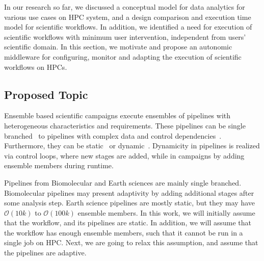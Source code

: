 
In our research so far, we discussed a conceptual model for data analytics for 
various use cases on HPC system, and a design comparison and execution time 
model for scientific workflows. In addition, we identified a need for execution 
of  scientific workflows with minimum user intervention, independent from 
users' scientific domain. In this section, we motivate and propose an 
autonomic middleware for configuring, monitor and adapting the execution of 
scientific workflows on HPCs.

\subsection{Proposed Topic}
%
%

Ensemble based scientific campaigns execute ensembles of pipelines with 
heterogeneous characteristics and requirements. These pipelines can be single 
branched~\cite{paraskevakos2019workflow,dakka2018high,ramakrishnan_survey,
balasubramanian2018harnessing} to pipelines with complex data and control 
dependencies~\cite{ramakrishnan_survey,deelman2018future}. Furthermore, they 
can be static~\cite{paraskevakos2019workflow} or dynamic~\cite{dakka2018high,
balasubramanian2018harnessing}. Dynamicity in pipelines is realized via 
control loops, where new stages are added, while in campaigns by adding 
ensemble members during runtime.

Pipelines from Biomolecular and Earth sciences are mainly single branched. 
Biomolecular pipelines may present adaptivity by adding additional stages 
after some analysis step. Earth science pipelines are mostly static, but they 
may have $\mathcal{O}(10k)$ to $\mathcal{O}(100k)$ ensemble members. In this 
work, we will initially assume that the workflow, and its pipelines are 
static. In addition, we will assume that the workflow has enough ensemble 
members, such that it cannot be run in a single job on HPC. Next, we are 
going to relax this assumption, and assume that the pipelines are adaptive.

